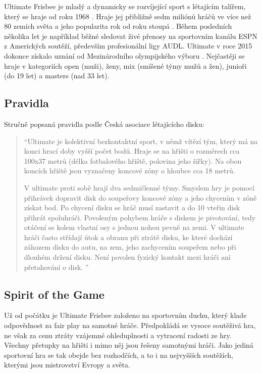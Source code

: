\documentclass[thesis=B,czech]{FITthesis}[2012/06/26]
\begin{document}
\indent

Ultimate Frisbee je mladý a dynamicky se rozvíjející sport s létajícím talířem,
který se hraje od roku 1968 \cite{cald-o-ultimate}. Hraje jej přibližně sedm miliónů
hráčů ve více než 80 zemích světa a jeho popularita rok od roku stoupá \cite{usa-about-ultimate}.
Během posledních několika let je například běžné sledovat živé přenosy na sportovním kanálu ESPN
z Amerických soutěží, především profesionální ligy AUDL. Ultimate v roce 2015 dokonce získalo
uznání od Mezinárodního olympijského výboru \cite{cald-uznani}. Nejčastěji se hraje v kategoriích
open (muži), ženy, mix (smíšené týmy mužů a žen), junioři (do 19 let) a masters (nad 33 let).

\subsection{Pravidla}

Stručně popsaná pravidla podle Česká asociace lé\-ta\-jícícho disku:

\begin{quote}
``Ultimate je kolektivní bezkontaktní sport, v němž vítězí tým, který má na konci hrací doby
vyšší počet bodů. Hraje se na hřišti o rozměrech cca 100x37 metrů (délka fotbalového hřiště,
polovina jeho šířky). Na obou koncích hřiště jsou vyznačeny koncové zóny o hloubce cca 18 metrů.

V ultimate proti sobě hrají dva sedmičlenné týmy. Smyslem hry je pomocí přihrávek dopravit disk
do soupeřovy koncové zóny a jeho chycením v zóně získat bod. Po chycení disku se hráč musí
zastavit a do 10 vteřin disk přihrát spoluhráči. Povoleným pohybem hráče s diskem je pivotování,
tedy otáčení se kolem vlastní osy s jednou nohou pevně na zemi. V ultimate hráči často střídají
útok a obranu při ztrátě disku, ke které dochází záhozem disku do autu, na zem, jeho zachycením
soupeřem nebo při dlouhém držení disku. Není povolen fyzický kontakt mezi hráči ani přetahování
o disk.	''
\end{quote}


\subsection{Spirit of the Game}

\indent

Už od počátku je Ultimate Frisbee založeno na sportovním duchu, který klade odpovědnost
za fair play na samotné hráče. Předpokládá se vysoce soutěživá hra, ne však za cenu ztráty
vzájemné ohleduplnosti a vytracení radosti ze hry. Všechny přetupky na hřišti i mimo něj jsou
řešeny samotnými hráči. Jako jediná sportovní hra se tak obejde bez rozhodčích, a to i
na nejvyšších soutěžích, kterými jsou mistrovství Evropy a světa.
\end{document}
